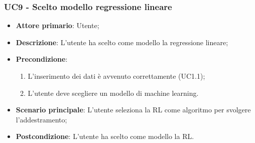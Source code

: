 \subsubsection{UC9 - Scelto modello regressione lineare}%
\label{sssec:uc9}
\begin{itemize}
  \item \textbf{Attore primario}: Utente;
  \item \textbf{Descrizione}: L'utente ha scelto come modello la regressione lineare;
  \item \textbf{Precondizione}:
  \begin{enumerate}
    \item L'inserimento dei dati è avvenuto correttamente (UC1.1);
    \item L'utente deve scegliere un modello di machine learning.
  \end{enumerate}
  \item \textbf{Scenario principale}: L'utente seleziona la RL come algoritmo per svolgere l'addestramento;
  \item \textbf{Postcondizione}: L'utente ha scelto come modello la RL.
\end{itemize}
